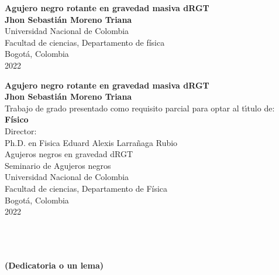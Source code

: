 \begin{center}
\begin{figure}
\centering%
%
\end{figure}
\thispagestyle{empty} \vspace*{2.0cm} \textbf{\huge
Agujero negro rotante en gravedad masiva dRGT}\\[6.0cm]
\Large\textbf{Jhon Sebastián Moreno Triana}\\[6.0cm]
\small Universidad Nacional de Colombia\\
Facultad de ciencias, Departamento de física\\
Bogotá, Colombia\\
2022\\
\end{center}

\newpage{\pagestyle{empty}\cleardoublepage}

\newpage
\begin{center}
\thispagestyle{empty} \vspace*{0cm} \textbf{\huge
Agujero negro rotante en gravedad masiva dRGT}\\[3.0cm]
\Large\textbf{Jhon Sebastián Moreno Triana}\\[3.0cm]
\small Trabajo de grado presentado como requisito parcial para optar al
t\'{\i}tulo de:\\
\textbf{Físico}\\[2.5cm]
Director:\\
Ph.D. en Fisica Eduard Alexis Larrañaga Rubio\\[2.0cm]

Agujeros negros en gravedad dRGT\\
Seminario de Agujeros negros\\[2.5cm]
Universidad Nacional de Colombia\\
Facultad de ciencias, Departamento de Física\\
Bogotá, Colombia\\
2022\\
\end{center}

\newpage{\pagestyle{empty}\cleardoublepage}

\newpage
\thispagestyle{empty} \textbf{}\normalsize
\\\\\\%
\textbf{(Dedicatoria o un lema)}\\[4.0cm]

